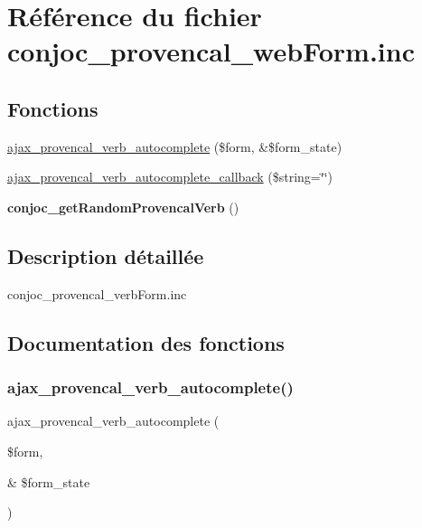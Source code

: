 \hypertarget{conjoc__provencal__webForm_8inc}{}\section{Référence du fichier conjoc\+\_\+provencal\+\_\+web\+Form.\+inc}
\label{conjoc__provencal__webForm_8inc}
\subsection*{Fonctions}
\begin{DoxyCompactItemize}
\item 
\hyperlink{conjoc__provencal__webForm_8inc_aac31f536bfd83a81f1ea012f5ecdc9ad}{ajax\+\_\+provencal\+\_\+verb\+\_\+autocomplete} (\$form, \&\$form\+\_\+state)
\item 
\hyperlink{conjoc__provencal__webForm_8inc_a2f2da1c5cc327e80252b73dd250aa363}{ajax\+\_\+provencal\+\_\+verb\+\_\+autocomplete\+\_\+callback} (\$string=\char`\"{}\char`\"{})
\item 
\hypertarget{conjoc__provencal__webForm_8inc_a8e95bdf8c2d2a450e6485d589788aa83}{}\label{conjoc__provencal__webForm_8inc_a8e95bdf8c2d2a450e6485d589788aa83} 
{\bfseries conjoc\+\_\+get\+Random\+Provencal\+Verb} ()
\end{DoxyCompactItemize}


\subsection{Description détaillée}
conjoc\+\_\+provencal\+\_\+verb\+Form.\+inc 

\subsection{Documentation des fonctions}
\hypertarget{conjoc__provencal__webForm_8inc_aac31f536bfd83a81f1ea012f5ecdc9ad}{}\label{conjoc__provencal__webForm_8inc_aac31f536bfd83a81f1ea012f5ecdc9ad} 
\subsubsection{\texorpdfstring{ajax\+\_\+provencal\+\_\+verb\+\_\+autocomplete()}{ajax\_provencal\_verb\_autocomplete()}}
{\footnotesize\ttfamily ajax\+\_\+provencal\+\_\+verb\+\_\+autocomplete (\begin{DoxyParamCaption}\item[{}]{\$form,  }\item[{\&}]{\$form\+\_\+state }\end{DoxyParamCaption})}


